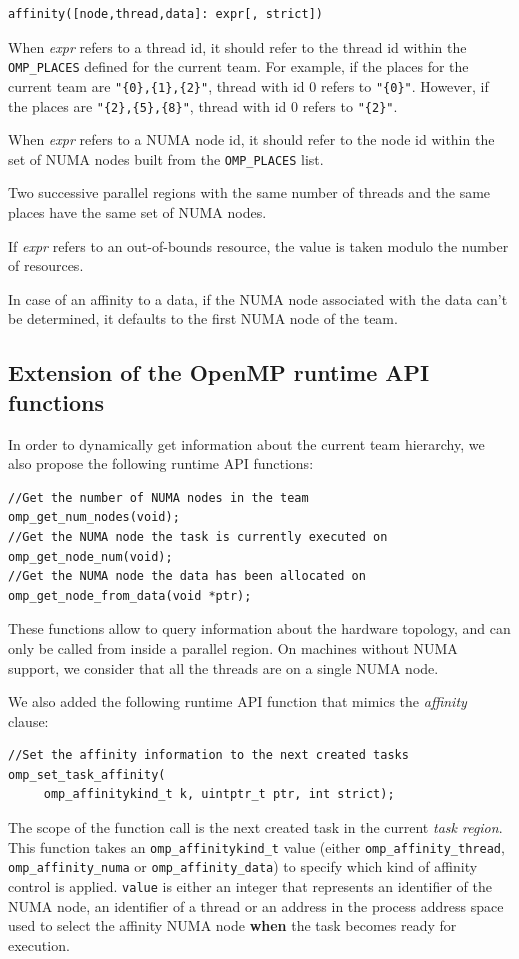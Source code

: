 \documentclass{Styles/llncs}
\begin{document}
\begin{lstlisting}
affinity([node,thread,data]: expr[, strict])
\end{lstlisting}

When \emph{expr} refers to a thread id, it should refer to the thread id within
the \verb/OMP_PLACES/ defined for the current team. For example, if the places for the
current team are \verb/"{0},{1},{2}"/, thread with id 0 refers to \verb/"{0}"/.
However, if the places are \verb/"{2},{5},{8}"/, thread with id 0 refers to \verb/"{2}"/.

When \emph{expr} refers to a NUMA node id, it should refer to the node id within
the set of NUMA nodes built from the \verb/OMP_PLACES/ list.

Two successive parallel regions with the same number of threads and the same places have
the same set of NUMA nodes.

If \emph{expr} refers to an out-of-bounds resource, the value is taken modulo the number of resources.

In case of an affinity to a data, if the NUMA node associated with the data can't be determined, it defaults to the first NUMA node of the team.

\subsection{Extension of the OpenMP runtime API functions}
In order to dynamically get information about the current team hierarchy, we also propose
the following runtime API functions:
\begin{lstlisting}
//Get the number of NUMA nodes in the team
omp_get_num_nodes(void);
//Get the NUMA node the task is currently executed on
omp_get_node_num(void);
//Get the NUMA node the data has been allocated on
omp_get_node_from_data(void *ptr);
\end{lstlisting}

These functions allow to query information about the hardware topology, and can only be called from inside a parallel region. On machines without NUMA support, we consider that all the threads are on a single NUMA node.

We also added the following runtime API function that mimics the \textit{affinity} clause:
\begin{lstlisting}
//Set the affinity information to the next created tasks
omp_set_task_affinity( 
     omp_affinitykind_t k, uintptr_t ptr, int strict);
\end{lstlisting}
The scope of the function call is the next created task in the current \textit{task region}.
This function takes an \texttt{omp\_affinitykind\_t} value (either \texttt{omp\_affinity\_thread}, \texttt{omp\_affinity\_numa} or \texttt{omp\_affinity\_data}) to specify which kind of affinity control is applied. \texttt{value} is either an integer that represents an identifier of the NUMA node, an identifier of a thread or an address in the process address space used to select the affinity NUMA node \textbf{when} the task becomes ready for execution.
\end{document}
